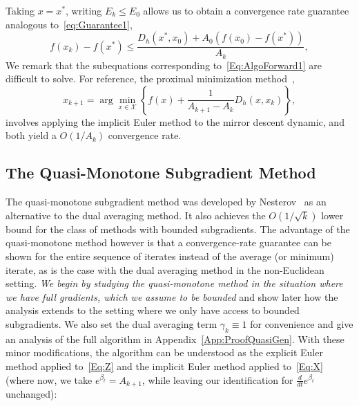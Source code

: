 \documentclass[11pt]{article}
\theoremstyle{plain}
\newcommand{\X}{{\mathcal X}}
\begin{document}
\noindent Taking $x = x^\ast$, writing $E_k \leq E_0$ allows us to obtain a convergence rate guarantee analogous to~\eqref{eq:Guarantee1},
\begin{equation}
f(x_k) - f(x^\ast) \leq \frac{D_h(x^\ast, x_0) + A_0 (f(x_0) - f(x^\ast))}{A_k},
\end{equation} 
%
We remark that the subequations corresponding to~\eqref{Eq:AlgoForward1} are difficult to solve. For reference, the proximal minimization method~\cite{ChenTeboulle93}, 
\begin{equation}
x_{k+1} = \arg\min_{x\in\X} \left\{ f(x) + \frac{1}{A_{k+1} - A_k}D_h\left(x, x_k\right)\right\},
\end{equation}
involves applying the implicit Euler method to the mirror descent dynamic, and both yield a $O(1/A_k)$ convergence rate. 

\subsection{The Quasi-Monotone Subgradient Method}
\label{Sec:QuasiMono}
The quasi-monotone subgradient method was developed by Nesterov~\cite{Nesterov15} as an alternative to the dual averaging method.  It also achieves the $O(1/\sqrt{k})$ lower bound for the class of methods with bounded subgradients. The advantage of the quasi-monotone method however is that a convergence-rate guarantee can be shown for the entire sequence of iterates instead of the average (or minimum) iterate, as is the case with the dual averaging method in the non-Euclidean setting. {\em We begin by studying the quasi-monotone method in the situation where we have full gradients, which we assume to be bounded} and show later how the analysis extends to the setting where we only have access to bounded subgradients. We also set the dual averaging term $\gamma_k \equiv 1$ for convenience and give an analysis of the full algorithm in Appendix~\ref{App:ProofQuasiGen}.  With these minor modifications, the algorithm can be understood as the explicit Euler method applied to~\eqref{Eq:Z} and the implicit Euler method applied to~\eqref{Eq:X} (where now, we take $e^{\beta_t} = A_{k+1}$, while leaving our identification for $\frac{d}{dt} e^{\beta_t}$ unchanged):
\end{document}

